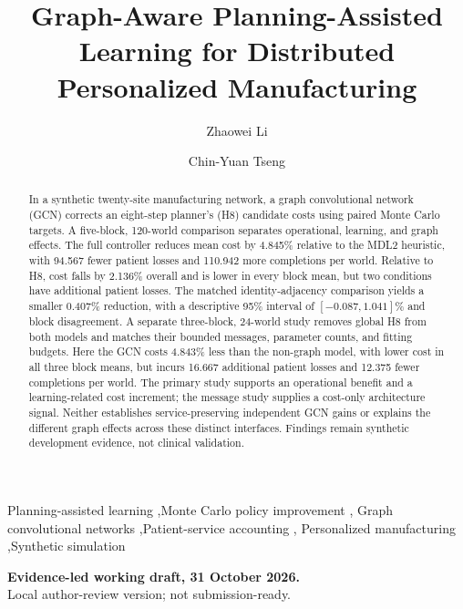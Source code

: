 \documentclass[preprint,12pt]{elsarticle}
\begin{document}
\begin{frontmatter}
\title{Graph-Aware Planning-Assisted Learning for Distributed Personalized Manufacturing}
\author[inst1]{Zhaowei Li}
\author[inst1]{Chin-Yuan Tseng}

\begin{abstract}
In a synthetic twenty-site manufacturing network, a graph convolutional network
(GCN) corrects an eight-step planner's (H8) candidate costs using paired
Monte Carlo targets. A five-block, 120-world comparison separates operational,
learning, and graph effects.
The full controller reduces mean cost by 4.845\% relative to the MDL2 heuristic,
with 94.567 fewer patient losses and 110.942 more completions per world.
Relative to H8, cost falls by 2.136\% overall and is lower in every block mean,
but two conditions have additional patient losses. The matched
identity-adjacency comparison yields a smaller 0.407\% reduction, with a
descriptive 95\% interval of $[-0.087,1.041]\%$ and block disagreement.
A separate three-block, 24-world study removes global H8 from both models
and matches their bounded messages, parameter counts, and fitting budgets.
Here the GCN costs 4.843\% less than the non-graph model, with lower cost in
all three block means, but incurs 16.667 additional patient losses and
12.375 fewer completions per world. The primary study supports an operational
benefit and a learning-related cost increment; the message study supplies a
cost-only architecture signal. Neither establishes service-preserving
independent GCN gains or explains the different graph effects across these
distinct interfaces. Findings remain synthetic development evidence, not
clinical validation.
\end{abstract}
\begin{keyword}
Planning-assisted learning \sep Monte Carlo policy improvement \sep
Graph convolutional networks \sep Patient-service accounting \sep
Personalized manufacturing \sep Synthetic simulation
\end{keyword}
\end{frontmatter}
\linenumbers

\begin{center}
\textbf{Evidence-led working draft, 31 October 2026.}\\
Local author-review version; not submission-ready.
\end{center}
\end{document}
